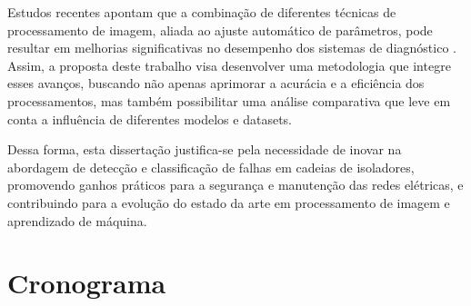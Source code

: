 Estudos recentes apontam que a combinação de diferentes técnicas de processamento de imagem, aliada ao ajuste automático de parâmetros, pode resultar em melhorias significativas no desempenho dos sistemas de diagnóstico \cite{Li2019}. Assim, a proposta deste trabalho visa desenvolver uma metodologia que integre esses avanços, buscando não apenas aprimorar a acurácia e a eficiência dos processamentos, mas também possibilitar uma análise comparativa que leve em conta a influência de diferentes modelos e datasets.

Dessa forma, esta dissertação justifica-se pela necessidade de inovar na abordagem de detecção e classificação de falhas em cadeias de isoladores, promovendo ganhos práticos para a segurança e manutenção das redes elétricas, e contribuindo para a evolução do estado da arte em processamento de imagem e aprendizado de máquina.

\section{Cronograma}


    

